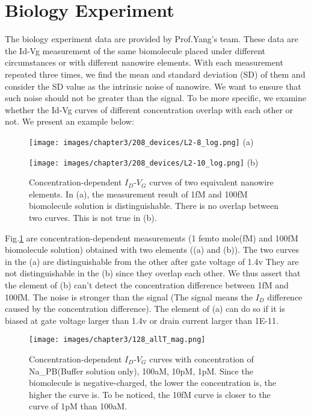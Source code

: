\section{Biology Experiment}
The biology experiment data are provided by Prof.Yang's team.
These data are the Id-Vg measurement of the same biomolecule placed under different circumstances or with different nanowire elements.
With each measurement repeated three times, we find the mean and standard deviation (SD) of them and consider the SD value as the intrinsic noise of nanowire.
We want to ensure that such noise should not be greater than the signal.
To be more specific, we examine whether the Id-Vg curves of different concentration overlap with each other or not.
We present an example below:
\begin{figure}[!htbp]
    \centering
    \begin{minipage}[t]{0.4\textwidth}
        \centering
        \texttt{[image: images/chapter3/208\_devices/L2-8\_log.png]}
        (a)
    \end{minipage}
    \hfill
    \begin{minipage}[t]{0.4\textwidth}
        \centering
        \texttt{[image: images/chapter3/208\_devices/L2-10\_log.png]}
        (b)
    \end{minipage}
    \caption{Concentration-dependent $I_D$-$V_G$ curves of two equivalent nanowire elements.
    In (a), the measurement result of 1fM and 100fM biomolecule solution is distinguishable. There is no overlap between two curves. This is not true in (b).}
    \label{fig:SD_sucandfail}
\end{figure}

Fig.\ref{fig:SD_sucandfail} are concentration-dependent measurements (1 femto mole(fM) and 100fM biomolecule solution) obtained with two elements ((a) and (b)).
The two curves in the (a) are distinguishable from the other after gate voltage of 1.4v
They are not distinguishable in the (b) since they overlap each other.
We thus assert that the element of (b) can't detect the concentration difference between 1fM and 100fM.
The noise is stronger than the signal (The signal means the $I_D$ difference caused by the concentration difference).
The element of (a) can do so if it is biased at gate voltage larger than 1.4v or drain current larger than 1E-11.

\begin{figure}[!htb]
        \texttt{[image: images/chapter3/128\_allT\_mag.png]}
    \caption{Concentration-dependent $I_D$-$V_G$ curves with concentration of Na\_PB(Buffer solution only), 100aM, 10pM, 1pM.
    Since the biomolecule is negative-charged, the lower the concentration is, the higher the curve is.
    To be noticed, the 10fM curve is closer to the curve of 1pM than 100aM.
     }
    \label{fig:SD_allT}
\end{figure}

